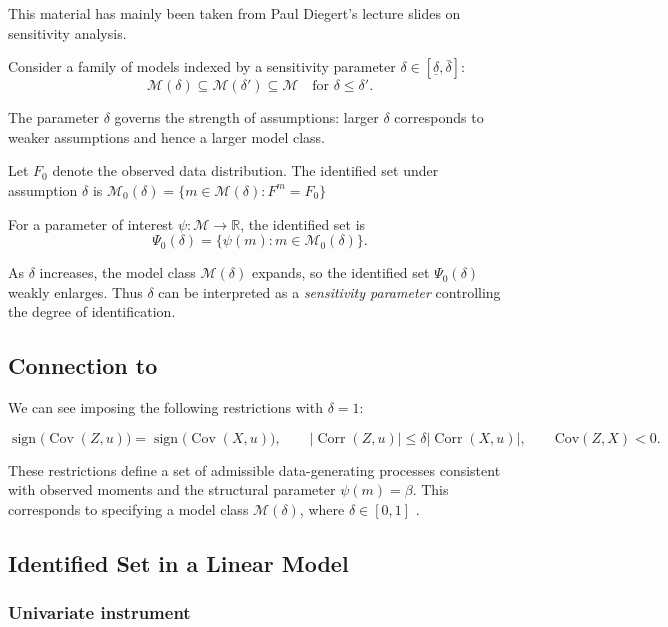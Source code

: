 \documentclass[12pt]{article}
\begin{document}
This material has mainly been taken from Paul Diegert's lecture slides on sensitivity analysis. 

Consider a family of models indexed by a sensitivity parameter $\delta \in [\underline{\delta}, \bar{\delta}]$:
\[
\mathcal{M}(\delta) \subseteq \mathcal{M}(\delta') \subseteq \mathcal{M}
\quad \text{for } \delta \le \delta'.
\]

The parameter $\delta$ governs the strength of assumptions: larger $\delta$ corresponds to weaker assumptions and hence a larger model class.

Let $F_0$ denote the observed data distribution. The identified set under assumption $\delta$ is $\mathcal{M}_0(\delta) = \{ m \in \mathcal{M}(\delta) : F^m = F_0 \}$


For a parameter of interest $\psi : \mathcal{M} \to \mathbb{R}$, the identified set is
\[
\Psi_0(\delta) = \{ \psi(m) : m \in \mathcal{M}_0(\delta) \}.
\]

As $\delta$ increases, the model class $\mathcal{M}(\delta)$ expands, so the identified set $\Psi_0(\delta)$ weakly enlarges. Thus $\delta$ can be interpreted as a \emph{sensitivity parameter} controlling the degree of identification.

\subsection{Connection to \textcite{nevo2012}}

We can see \textcite{nevo2012} imposing the following restrictions with $\delta = 1$:

\[
\operatorname{sign}\bigl(\operatorname{Cov}(Z,u)\bigr)
=
\operatorname{sign}\bigl(\operatorname{Cov}(X,u)\bigr),
\qquad
\lvert \operatorname{Corr}(Z,u) \rvert \le \delta \lvert \operatorname{Corr}(X,u) \rvert, \qquad \text{Cov}(Z,X) < 0.
\]

These restrictions define a set of admissible data-generating processes consistent with observed moments and the structural parameter $\psi(m) = \beta$. This corresponds to specifying a model class $\mathcal{M}(\delta)$, where $\delta \in [0,1]$ .

\subsection{Identified Set in a Linear Model}
\subsubsection{Univariate instrument}
\end{document}
